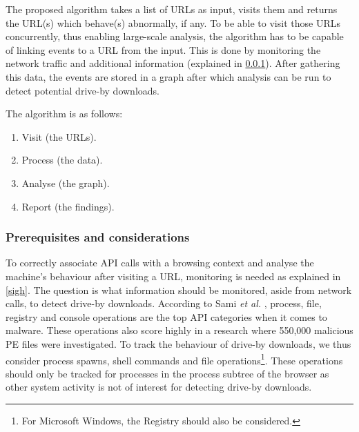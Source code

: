 The proposed algorithm takes a list of URLs as input, visits them and returns the URL(s) which behave(s) abnormally, if any. To be able to visit those URLs concurrently, thus enabling large-scale analysis, the algorithm has to be capable of linking events to a URL from the input. This is done by monitoring the network traffic and additional information (explained in \ref{sec:prereq}). After gathering this data, the events are stored in a graph after which analysis can be run to detect potential drive-by downloads.

The algorithm is as follows:

\begin{changemargin}{5cm}{0cm}
\begin{enumerate}
\item Visit (the URLs).
\item Process (the data).
\item Analyse (the graph).
\item Report (the findings).
\end{enumerate}
\end{changemargin}

\subsubsection{Prerequisites and considerations}
\label{sec:prereq}

To correctly associate API calls with a browsing context and analyse the machine's behaviour after visiting a URL, monitoring is needed as explained in \ref{sigh}. The question is what information should be monitored, aside from network calls, to detect drive-by downloads. According to Sami \textit{et al.} \cite{Sami:2010:MDB:1774088.1774303}, process, file, registry and console operations are the top API categories when it comes to malware. These operations also score highly in a research \cite{MaliciousAPIs} where 550,000 malicious PE files were investigated. To track the behaviour of drive-by downloads, we thus consider process spawns, shell commands and file operations\footnote{For Microsoft Windows, the Registry should also be considered.}. These operations should only be tracked for processes in the process subtree of the browser as other system activity is not of interest for detecting drive-by downloads.


